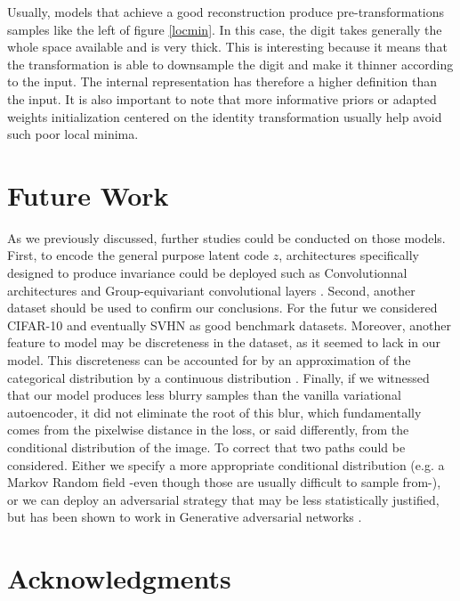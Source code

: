 \documentclass[letterpaper, twoside]{article}
\begin{document}
    Usually, models that achieve a good reconstruction produce pre-transformations samples like the left of figure \ref{locmin}. In this case, the digit takes generally the whole space available and is very thick. This is interesting because it means that the transformation is able to downsample the digit and make it thinner according to the input. The internal representation has therefore a higher definition than the input. It is also important to note that more informative priors or adapted weights initialization centered on the identity transformation usually help avoid such poor local minima.

\section{Future Work}

  As we previously discussed, further studies could be conducted on those models. First, to encode the general purpose latent code $z$, architectures specifically designed to produce invariance could be deployed such as Convolutionnal architectures \cite{lecun-gradientbased-learning-applied-1998} and Group-equivariant convolutional layers \cite{cohen.groupequi}. Second, another dataset should be used to confirm our conclusions. For the futur we considered CIFAR-10 \cite{cifar10} and eventually SVHN \cite{svhn} as good benchmark datasets. Moreover, another feature to model may be discreteness in the dataset, as it seemed to lack in our model. This discreteness can be accounted for by an approximation of the categorical distribution by a continuous distribution \cite{JangCatReparam}. Finally, if we witnessed that our model produces less blurry samples than the vanilla variational autoencoder, it did not eliminate the root of this blur, which fundamentally comes from the pixelwise distance in the loss, or said differently, from the conditional distribution of the image. To correct that two paths could be considered. Either we specify a more appropriate conditional distribution (e.g. a Markov Random field \cite{Geman:1984:SRG:2286442.2286617} -even though those are usually difficult to sample from-), or we can deploy an adversarial strategy that may be less statistically justified, but has been shown to work in Generative adversarial networks \cite{Goodfellow.gan}.


\section*{Acknowledgments} 
\end{document}
